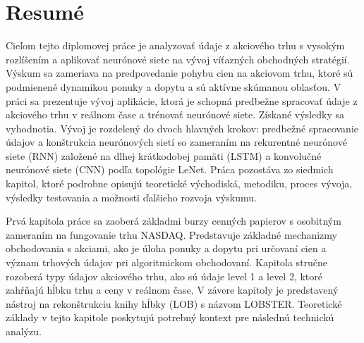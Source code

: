\documentclass[a4paper,oneside,onecolumn,12pt]{book}
\begin{document}
\pagebreak
\section*{Resumé}
Cieľom tejto diplomovej práce je analyzovať údaje z akciového trhu s vysokým rozlíšením a aplikovať neurónové siete na vývoj víťazných obchodných stratégií. Výskum sa zameriava na predpovedanie pohybu cien na akciovom trhu, ktoré sú podmienené dynamikou ponuky a dopytu a sú aktívne skúmanou oblasťou. V práci sa prezentuje vývoj aplikácie, ktorá je schopná predbežne spracovať údaje z akciového trhu v reálnom čase a trénovať neurónové siete. Získané výsledky sa vyhodnotia. Vývoj je rozdelený do dvoch hlavných krokov: predbežné spracovanie údajov a konštrukcia neurónových sietí so zameraním na rekurentné neurónové siete (RNN) založené na dlhej krátkodobej pamäti (LSTM) a konvolučné neurónové siete (CNN) podľa topológie LeNet. Práca pozostáva zo siedmich kapitol, ktoré podrobne opisujú teoretické východiská, metodiku, proces vývoja, výsledky testovania a možnosti ďalšieho rozvoja výskumu.

Prvá kapitola práce sa zaoberá základmi burzy cenných papierov s osobitným zameraním na fungovanie trhu NASDAQ. Predstavuje základné mechanizmy obchodovania s akciami, ako je úloha ponuky a dopytu pri určovaní cien a význam trhových údajov pri algoritmickom obchodovaní. Kapitola stručne rozoberá typy údajov akciového trhu, ako sú údaje level 1 a level 2, ktoré zahŕňajú hĺbku trhu a ceny v reálnom čase. V závere kapitoly je predstavený nástroj na rekonštrukciu knihy hĺbky (LOB) s názvom LOBSTER. Teoretické základy v tejto kapitole poskytujú potrebný kontext pre následnú technickú analýzu.
\end{document}
